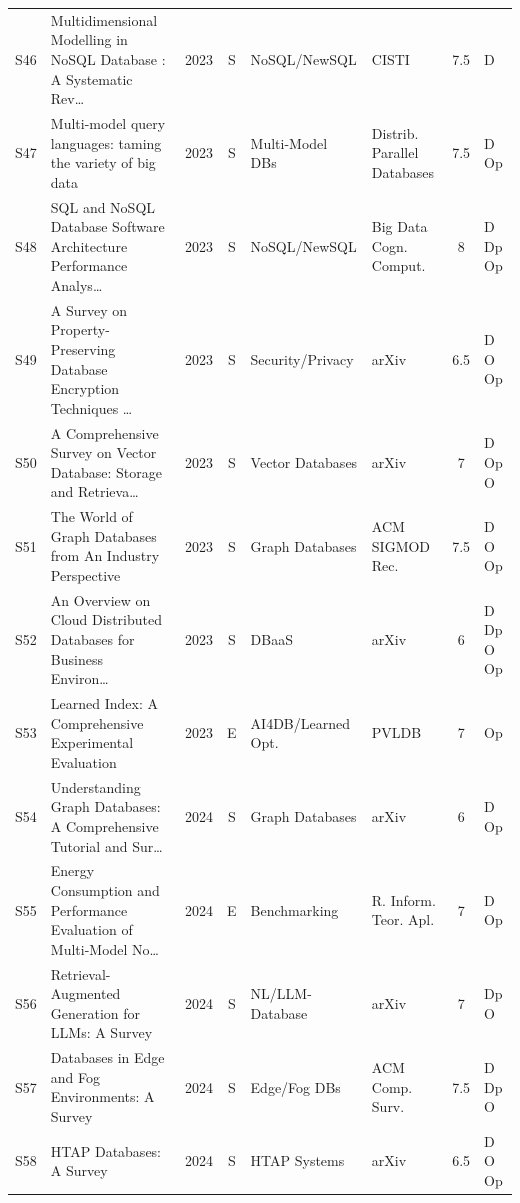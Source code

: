 \documentclass[a4paper,fleqn]{cas-sc}
\begin{document}
\begin{landscape}
\begin{longtable}{c p{3.5cm} c c p{2.45cm} p{2.3cm} c p{1.5cm}}
\addlinespace
S46 & Multidimensional Modelling in NoSQL Database : A Systematic Rev\ldots{}~\cite{Ferreira2023NoSQLMD} & 2023 & S & NoSQL/NewSQL & CISTI & 7.5 & D \\
\addlinespace
S47 & Multi-model query languages: taming the variety of big data~\cite{Guo2023MultiModel} & 2023 & S & Multi-Model DBs & Distrib. Parallel Databases & 7.5 & D Op \\
\addlinespace
S48 & SQL and NoSQL Database Software Architecture Performance Analys\ldots{}~\cite{Khan2023NoSQL} & 2023 & S & NoSQL/NewSQL & Big Data Cogn. Comput. & 8 & D Dp Op \\
\addlinespace
S49 & A Survey on Property-Preserving Database Encryption Techniques \ldots{}~\cite{Koppenwallner2023Sec} & 2023 & S & Security/Privacy & arXiv & 6.5 & D O Op \\
\addlinespace
S50 & A Comprehensive Survey on Vector Database: Storage and Retrieva\ldots{}~\cite{Ma2023VectorDB} & 2023 & S & Vector Databases & arXiv & 7 & D Op O \\
\addlinespace
S51 & The World of Graph Databases from An Industry Perspective~\cite{Tian2023GraphDB} & 2023 & S & Graph Databases & ACM SIGMOD Rec. & 7.5 & D O Op \\
\addlinespace
S52 & An Overview on Cloud Distributed Databases for Business Environ\ldots{}~\cite{Vikiru2023DBaaS} & 2023 & S & DBaaS & arXiv & 6 & D Dp O Op \\
\addlinespace
S53 & Learned Index: A Comprehensive Experimental Evaluation~\cite{Woltmann2023DNNIndex} & 2023 & E & AI4DB/Learned Opt. & PVLDB & 7 & Op \\
\addlinespace
S54 & Understanding Graph Databases: A Comprehensive Tutorial and Sur\ldots{}~\cite{Anuyah2024GraphDB} & 2024 & S & Graph Databases & arXiv & 6 & D Op \\
\addlinespace
S55 & Energy Consumption and Performance Evaluation of Multi-Model No\ldots{}~\cite{Falcao2024Bench} & 2024 & E & Benchmarking & R. Inform. Teor. Apl. & 7 & D Op \\
\addlinespace
S56 & Retrieval-Augmented Generation for LLMs: A Survey~\cite{Gao2024RAGSurvey} & 2024 & S & NL/LLM-Database & arXiv & 7 & Dp O \\
\addlinespace
S57 & Databases in Edge and Fog Environments: A Survey~\cite{Gomes2024EdgeFog} & 2024 & S & Edge/Fog DBs & ACM Comp. Surv. & 7.5 & D Dp O \\
\addlinespace
S58 & HTAP Databases: A Survey~\cite{Haas2024HTAPSurvey} & 2024 & S & HTAP Systems & arXiv & 6.5 & D O Op \\

\end{longtable}
\end{landscape}
\end{document}
